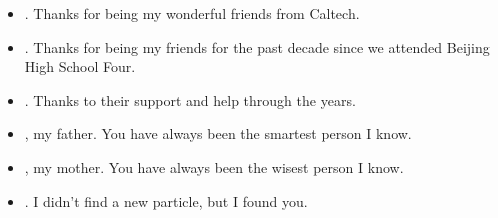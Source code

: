 \begin{itemize}
	\item {}. Thanks for being my wonderful friends from Caltech.
	\item {}. Thanks for being my friends for the past decade since we attended Beijing High School Four.
	\item {}. Thanks to their support and help through the years.
	\item {}, my father. You have always been the smartest person I know.
	\item {}, my mother. You have always been the wisest person I know.
	\item {}. I didn't find a new particle, but I found you.
\end{itemize}


